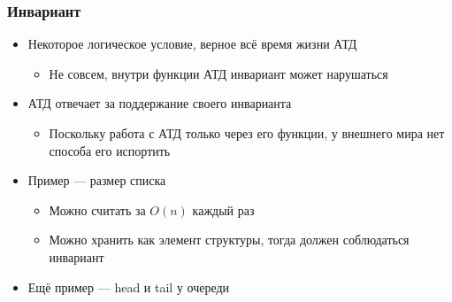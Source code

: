 \documentclass{../../slides-style}
\begin{document}
    \begin{frame}
        \frametitle{Инвариант}
        \begin{itemize}
            \item Некоторое логическое условие, верное всё время жизни АТД
            \begin{itemize}
                \item Не совсем, внутри функции АТД инвариант может нарушаться
            \end{itemize}
            \item АТД отвечает за поддержание своего инварианта
            \begin{itemize}
                \item Поскольку работа с АТД только через его функции, у внешнего мира нет способа его испортить
            \end{itemize}
            \item Пример --- размер списка
            \begin{itemize}
                \item Можно считать за $O(n)$ каждый раз
                \item Можно хранить как элемент структуры, тогда должен соблюдаться инвариант
            \end{itemize}
            \item Ещё пример --- head и tail у очереди
        \end{itemize}
    \end{frame}
\end{document}
